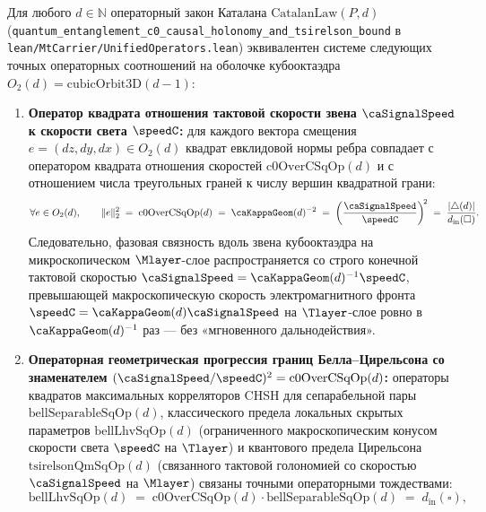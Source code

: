 \begin{theorem}
\label{thm:entanglement-c0-tsirelson}
Для любого $d\in\mathbb{N}$ операторный закон Каталана $\mathrm{CatalanLaw}(P,d)$ (\texttt{quantum\_entanglement\_c0\_causal\_holonomy\_and\_tsirelson\_bound} в \texttt{lean/MtCarrier/UnifiedOperators.lean}) эквивалентен системе следующих точных операторных соотношений на оболочке кубооктаэдра $O_2(d)=\mathrm{cubicOrbit3D}(d-1)$:
\begin{enumerate}[label=\textbf{(\roman*)},leftmargin=*]
\item \textbf{Оператор квадрата отношения тактовой скорости звена $\caSignalSpeed$ к скорости света $\speedC$:}
  для каждого вектора смещения $e=(dz,dy,dx)\in O_2(d)$ квадрат евклидовой нормы ребра совпадает с оператором квадрата отношения скоростей $\mathrm{c0OverCSqOp}(d)$ и с отношением числа треугольных граней к числу вершин квадратной грани:
  \begin{equation}
  \label{eq:c0-over-c-sq-operator}
    \forall e\in O_2(d),\qquad
    \|e\|_2^2 \;=\; \mathrm{c0OverCSqOp}(d) \;=\; \caKappaGeom(d)^{-2} \;=\; \left(\frac{\caSignalSpeed}{\speedC}\right)^{\!2} \;=\; \frac{|{\triangle}(d)|}{d_{\mathrm{in}}(\square)}.
  \end{equation}
  Следовательно, фазовая связность вдоль звена кубооктаэдра на микроскопическом $\Mlayer$-слое распространяется со строго конечной тактовой скоростью $\caSignalSpeed = \caKappaGeom(d)^{-1}\speedC$, превышающей макроскопическую скорость электромагнитного фронта $\speedC = \caKappaGeom(d)\caSignalSpeed$ на $\Tlayer$-слое ровно в $\caKappaGeom(d)^{-1}$ раз --- без «мгновенного дальнодействия».
\item \textbf{Операторная геометрическая прогрессия границ Белла--Цирельсона со знаменателем $(\caSignalSpeed/\speedC)^2 = \mathrm{c0OverCSqOp}(d)$:}
  операторы квадратов максимальных корреляторов CHSH для сепарабельной пары $\mathrm{bellSeparableSqOp}(d)$, классического предела локальных скрытых параметров $\mathrm{bellLhvSqOp}(d)$ (ограниченного макроскопическим конусом скорости света $\speedC$ на $\Tlayer$) и квантового предела Цирельсона $\mathrm{tsirelsonQmSqOp}(d)$ (связанного тактовой голономией со скоростью $\caSignalSpeed$ на $\Mlayer$) связаны точными операторными тождествами:
  \begin{equation}
  \label{eq:bell-tsirelson-c0-ladder}
    \mathrm{bellLhvSqOp}(d) \;=\; \mathrm{c0OverCSqOp}(d)\cdot\mathrm{bellSeparableSqOp}(d) \;=\; d_{\mathrm{in}}(\square),

\end{equation}
\end{enumerate}
\end{theorem}
